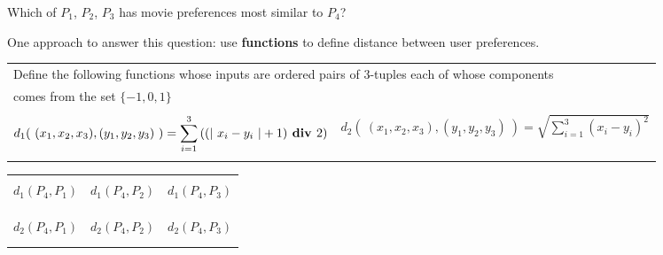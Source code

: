 


Which of $P_1$, $P_2$, $P_3$ has movie preferences most similar to $P_4$?

One approach to answer this question: use {\bf functions} to define distance between user preferences.

\begin{center}
\begin{tabular}{|c|c|}
\hline
\multicolumn{2}{|l|}{
Define the following functions whose inputs are ordered pairs of $3$-tuples each of whose components}\\
\multicolumn{2}{|l|}{
 comes from the set $\{-1,0,1\}$
}
\\
\hline
&\\
$\displaystyle d_{1}(~ (x_1, x_2, x_3) , (y_1, y_2, y_3) ~) =  \sum_{i=1}^3\left( (\lvert~x_i-y_i~\rvert + 1) \textbf{ div } 2 \right)$
&
$\displaystyle d_{2}(~ (x_1, x_2, x_3) , (y_1, y_2, y_3) ~) =  \sqrt{ \sum_{i=1}^3 (x_i - y_i)^2}$ \\
&\\
\hline
\end{tabular}
\end{center}

\begin{tabularx}{\textwidth}{|X|X|X|}
\hline &&\\
$d_1(P_4, P_1)$ & $d_1(P_4, P_2)$ & $d_1(P_4, P_3)$ \\
&&\\
&&\\
\hline&&\\
$d_2(P_4, P_1)$ & $d_2(P_4, P_2)$ & $d_2(P_4, P_3)$ \\
&&\\
&&\\
\hline
\end{tabularx}


